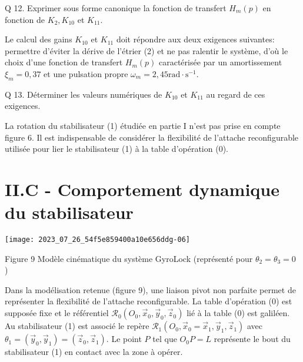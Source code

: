 Q 12. Exprimer sous forme canonique la fonction de transfert $H_{m}(p)$ en fonction de $K_{2}, K_{10}$ et $K_{11}$.

Le calcul des gains $K_{10}$ et $K_{11}$ doit répondre aux deux exigences suivantes: permettre d'éviter la dérive de l'étrier (2) et ne pas ralentir le système, d'où le choix d'une fonction de transfert $H_{m}(p)$ caractérisée par un amortissement $\xi_{m}=0,37$ et une pulsation propre $\omega_{m}=2,45 \mathrm{rad} \cdot \mathrm{s}^{-1}$.

Q 13. Déterminer les valeurs numériques de $K_{10}$ et $K_{11}$ au regard de ces exigences.

La rotation du stabilisateur (1) étudiée en partie I n'est pas prise en compte figure 6. Il est indispensable de considérer la flexibilité de l'attache reconfigurable utilisée pour lier le stabilisateur (1) à la table d'opération (0).

\section{II.C - Comportement dynamique du stabilisateur}
\begin{center}
\texttt{[image: 2023\_07\_26\_54f5e859400a10e656ddg-06]}
\end{center}

Figure 9 Modèle cinématique du système GyroLock (représenté pour $\theta_{2}=\theta_{3}=0$ )

Dans la modélisation retenue (figure 9), une liaison pivot non parfaite permet de représenter la flexibilité de l'attache reconfigurable. La table d'opération (0) est supposée fixe et le référentiel $\mathcal{R}_{0}\left(O_{0}, \vec{x}_{0}, \vec{y}_{0}, \vec{z}_{0}\right)$ lié à la table (0) est galiléen. Au stabilisateur (1) est associé le repère $\mathcal{R}_{1}\left(O_{0}, \vec{x}_{0}=\vec{x}_{1}, \vec{y}_{1}, \vec{z}_{1}\right)$ avec $\theta_{1}=\left(\vec{y}_{0}, \vec{y}_{1}\right)=\left(\vec{z}_{0}, \vec{z}_{1}\right)$. Le point $P$ tel que $O_{0} P=L$ représente le bout du stabilisateur (1) en contact avec la zone à opérer.

